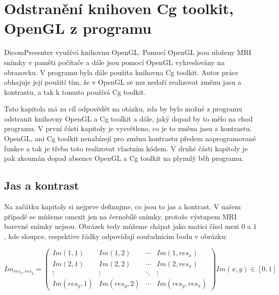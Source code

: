 \newpage
\chapter{Odstranění knihoven Cg toolkit, OpenGL z programu}
DicomPresenter využívá knihovnu OpenGL. Pomocí OpenGL jsou uloženy  MRI snímky v paměti počítače a dále jsou pomocí OpenGL vykreslovány na obrazovku. V programu byla dále použita knihovna Cg toolkit. Autor práce \cite{neskudla} obhajuje její použití tím, že v OpenGL se mu nedaří realizovat změnu jasu a kontrastu, a tak k tomuto používá Cg toolkit.

Tato kapitola má za cíl odpovědět na otázku, zda by bylo možné z programu odstranit knihovny OpenGL a Cg toolkit a dále, jaký dopad by to mělo na chod programu. V první části kapitoly je vysvětleno, co je to změna jasu a kontrastu. OpenGL, ani Cg toolkit nenabízejí pro změnu kontrastu předem naprogramované funkce a tak je třeba toto realizovat vlastním kódem. V druhé části kapitoly je pak zkoumán dopad absence OpenGL a Cg toolkit na plynulý běh programu.

\section{Jas  a kontrast}
Na začátku kapitoly si nejprve definujme, co jsou to jas a kontrast. V našem případě se můžeme omezit jen na černobílé snímky, protože výstupem MRI barevné snímky nejsou. Obrázek tedy můžeme chápat jako matici čísel mezi $0$ a $1$, kde sloupce, respektive řádky odpovídají souřadnicím bodu v obrázku:

\begin{equation}
 Im_{res_{x},res_{y}} =
 \begin{pmatrix}
  Im(1,1) & Im(1,2) & \cdots & Im(1,res_{x}) \\
  Im(2,1) & Im(2,2) & \cdots & Im(2,res_{x}) \\
  \vdots  & \vdots  & \ddots & \vdots  \\
  Im(res_{y},1) & Im(res_{y},2) & \cdots & Im(res_{y},res_{x})
 \end{pmatrix}
 Im(x,y) \in [0,1]
\end{equation}

